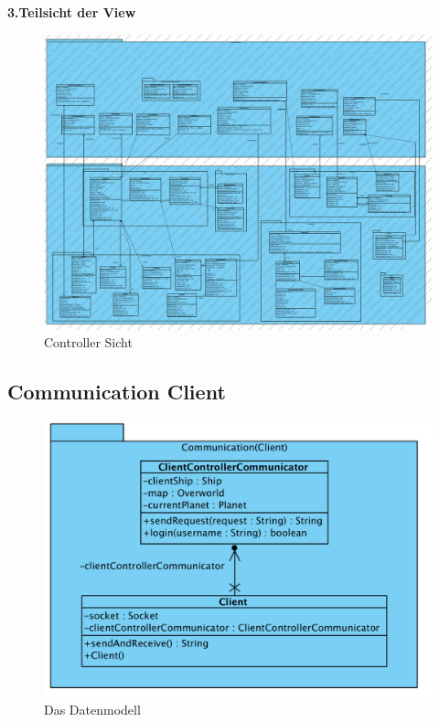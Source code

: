 \documentclass[fontsize=12pt,paper=a4,twoside]{scrartcl}
\begin{document}
\textbf{3.Teilsicht der View}
\begin{figure}[H]
\begin{center}
 \includegraphics[width=\textwidth]{../GT_Modulsicht/PDFs/View-Subdiagramm_UI.pdf}
  \caption{Controller Sicht}
  \label{fig:boat1}
\end{center}
\end{figure}


\subsection{Communication Client}
\begin{figure}[H]
\begin{center}
  \includegraphics[width=\linewidth]{../GT_Modulsicht/src/CommClient.png}
    \caption{Das Datenmodell}
\end{center}
\end{figure}
\end{document}
